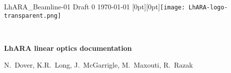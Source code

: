 \graphicspath{ {00-Top-matter/Figures/} }
\thispagestyle{empty}

\noindent LhARA\_Beamline-01 Draft 0 \hfill \today{} \hfill  \raisebox{-3.25mm}[0pt][0pt]{\texttt{[image: LhARA-logo-transparent.png]}}

\vspace{-0.25cm}
\noindent{\color{DarkYellow} \rule[0mm]{\textwidth}{0.43pt}}\\
\vspace{-0.50cm}


\begin{center}
  {\bf\LARGE\color{DarkBlue}
    LhARA linear optics documentation
  }
\end{center}
\vspace{-0.4cm}
\begin{center}
  N.~Dover, K.R.~Long, J.~McGarrigle, M.~Maxouti, R.~Razak
\end{center}
\vspace{-0.2cm}
